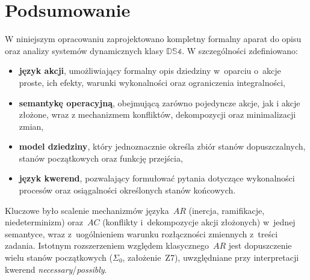 \documentclass[11pt,a4paper]{article}
\newif\ifshowbib
\theoremstyle{definition}
\begin{document}
\section{Podsumowanie}

W niniejszym opracowaniu zaprojektowano kompletny formalny aparat do opisu oraz analizy systemów dynamicznych klasy $\mathbb{DS4}$. W szczególności zdefiniowano:

\begin{itemize}
    \item \textbf{język akcji}, umożliwiający formalny opis dziedziny w~oparciu o~akcje proste, ich efekty, warunki wykonalności oraz ograniczenia integralności,
    \item \textbf{semantykę operacyjną}, obejmującą zarówno pojedyncze akcje, jak i akcje złożone, wraz z mechanizmem konfliktów, dekompozycji oraz minimalizacji zmian,
    \item \textbf{model dziedziny}, który jednoznacznie określa zbiór stanów dopuszczalnych, stanów początkowych oraz funkcję przejścia,
    \item \textbf{język kwerend}, pozwalający formułować pytania dotyczące wykonalności procesów oraz osiągalności określonych stanów końcowych.
\end{itemize}

Kluczowe było scalenie mechanizmów języka~$AR$ (inercja, ramifikacje, niedeterminizm) oraz~$AC$ (konflikty i~dekompozycje akcji złożonych) w~jednej semantyce, wraz z~uogólnieniem warunku rozłączności zmiennych z~treści zadania. Istotnym rozszerzeniem względem klasycznego~$AR$ jest dopuszczenie wielu stanów początkowych ($\Sigma_0$, założenie~Z7), uwzględniane przy interpretacji kwerend \textit{necessary}/\textit{possibly}.

\ifshowbib
\section{Literatura}

\fi
\end{document}
